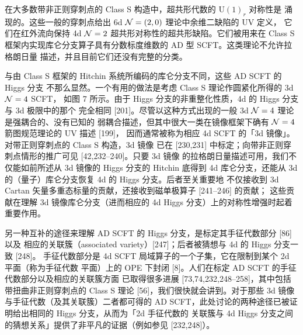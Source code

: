 
在大多数带非正则穿刺点的 Class S 构造中，超共形代数的 $\mathrm{U}(1)_r$ 对称性是
涌现的。这些一般的穿刺点给出 6d $\mathcal{N}=(2,0)$ 理论中余维二缺陷的 UV 定义，
它们在红外流向保持 4d $\mathcal{N}=2$ 超共形对称性的超共形缺陷。它们被用来在 Class S
框架内实现库仑分支算子具有分数标度维数的 AD 型 SCFT。这类理论不允许拉格朗日量
描述，并且目前它们还没有完整的分类。


与由 Class S 框架的 Hitchin 系统所编码的库仑分支不同，这些 AD SCFT 的 Higgs 分支
不那么显然。一个有用的做法是考虑 Class S 理论作圆紧化所得的 3d $\mathcal{N}=4$ SCFT，
如图 7 所示。由于 Higgs 分支的非重整化性质，4d 的 Higgs 分支与 3d 极限中的那个
完全相同 [201]。尽管以这种方式出现的一般 3d $\mathcal{N}=4$ 理论是强耦合的、没有已知的
弱耦合描述，但其中很大一类在镜像框架下确有 $\mathcal{N}=4$ 箭图规范理论的 UV 描述 [199]，
因而通常被称为相应 4d SCFT 的「3d 镜像」。对带正则穿刺点的 Class S 构造，3d 镜像
已在 [230,231] 中标定；向带非正则穿刺点情形的推广可见 [42,232--240]。只要 3d 镜像
的拉格朗日量描述可用，我们不仅能如前所述从 3d 镜像的 Higgs 分支的 Hitchin 底得到
4d 库仑分支，还能从 3d 的（量子）库仑分支恢复 4d 的 Higgs 分支。后者至关重要地
不仅接收到 3d Cartan 矢量多重态标量的贡献，还接收到磁单极算子 [241--246] 的贡献；
这些贡献在理解 3d 镜像库仑分支（进而相应的 4d Higgs 分支）上的对称性增强时起着
重要作用。


另一种互补的途径来理解 AD SCFT 的 Higgs 分支，是标定其手征代数部分 [86] 以及
相应的关联簇（associated variety）[247]；后者被猜想与 4d 的 Higgs 分支一致 [248]。
手征代数部分是 4d SCFT 局域算子的一个子集，它在限制到某个 2d 平面（称为手征代数
平面）上的 OPE 下封闭 [8]。人们在标定 AD SCFT 的手征代数部分以及相应的关联簇方面
已取得很多进展 [73,74,232,248--258]，其中包括带扭曲非正则穿刺点的 Class S 理论
[56]，我们很快就会讲到。对于那些 3d 镜像与手征代数（及其关联簇）二者都可得的
AD SCFT，此处讨论的两种途径已被证明给出相同的 Higgs 分支，从而为「2d 手征代数的
关联簇与 4d Higgs 分支之间的猜想关系」提供了非平凡的证据（例如参见 [232,248]）。

